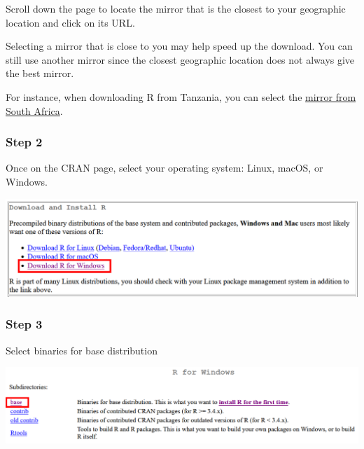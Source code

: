 \documentclass[
  letterpaper,
  DIV=11,
  numbers=noendperiod]{scrreprt}
\begin{document}
Scroll down the page to locate the mirror that is the closest to your
geographic location and click on its URL.

\begin{tcolorbox}[enhanced jigsaw, leftrule=.75mm, breakable, coltitle=black, opacitybacktitle=0.6, colframe=quarto-callout-tip-color-frame, bottomrule=.15mm, toptitle=1mm, left=2mm, opacityback=0, colbacktitle=quarto-callout-tip-color!10!white, rightrule=.15mm, bottomtitle=1mm, arc=.35mm, titlerule=0mm, title=\textcolor{quarto-callout-tip-color}{\faLightbulb}\hspace{0.5em}{Tip}, toprule=.15mm, colback=white]
Selecting a mirror that is close to you may help speed up the download.
You can still use another mirror since the closest geographic location
does not always give the best mirror.
\end{tcolorbox}

For instance, when downloading R from Tanzania, you can select the
\href{https://cran.mirror.ac.za/}{mirror from South Africa}.

\hypertarget{step-2}{%
\subsubsection{Step 2}\label{step-2}}

Once on the CRAN page, select your operating system: Linux, macOS, or
Windows.

\includegraphics{./images/paste-23A4B16E.png}

\hypertarget{step-3}{%
\subsubsection{Step 3}\label{step-3}}

Select binaries for base distribution

\includegraphics{./images/paste-0739A4C1.png}
\end{document}

